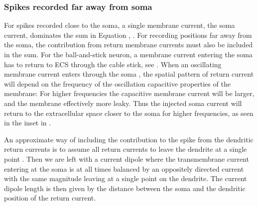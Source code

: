 \subsubsection{Spikes recorded far away from soma}
\label{sec:Spikes:far-spikes}
For spikes recorded close to the soma, a single membrane current, the soma current, dominates the sum in Equation , . For recording positions far away from the soma, the contribution from return membrane currents must also be included in the sum. For the ball-and-stick neuron, a membrane current entering the soma has to return to ECS through the cable stick, see . When an oscillating membrane current enters through the soma , the spatial pattern of return current will depend on the frequency of the oscillation  capacitive properties of the membrane: For higher frequencies the capacitive membrane current will be larger, and the membrane effectively more leaky. Thus the injected soma current will return to the extracellular space closer to the soma for higher frequencies, as  seen in the inset in .  

An approximate way of including the contribution to the spike from the dendritic return currents is to assume all return currents to leave the dendrite at a single point . Then we are left with a current dipole where the transmembrane current entering at the soma is at all times balanced by an oppositely directed current with the same magnitude leaving at a single point on the dendrite. The current dipole length is then given by the distance between the soma and the dendritic position of the return current.  

